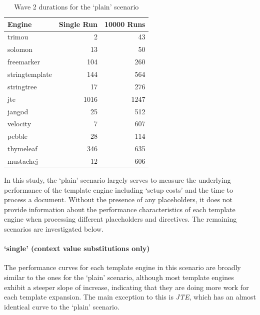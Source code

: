 \begin{table}[ht!]
\centering
\begin{tabular}{lrr}
\textbf{Engine} & \textbf{Single Run} & \textbf{10000 Runs} \\
\hline
trimou & 2 & 43 \\
solomon & 13 & 50 \\
freemarker & 104 & 260 \\
stringtemplate & 144 & 564 \\
stringtree & 17 & 276 \\
jte & 1016 & 1247 \\
jangod & 25 & 512\\
velocity & 7 & 607\\
pebble & 28 & 114 \\
thymeleaf & 346 & 635 \\
mustachej & 12 & 606 \\
\end{tabular}
\caption{Wave 2 durations for the `plain' scenario\label{w2:results:plain}}
\end{table}


In this study, the `plain' scenario largely serves to measure the underlying performance of the template engine including `setup costs' and the time to process a document. Without the presence of any placeholders, it does not provide information about the performance characteristics of each template engine when processing different placeholders and directives. The remaining scenarios are investigated below.

\paragraph{`single' (context value substitutions only)}

The performance curves for each template engine in this scenario are broadly similar to the ones for the `plain' scenario, although most template engines exhibit a steeper slope of increase, indicating that they are doing more work for each template expansion. The main exception to this is \emph{JTE}, which has an almost identical curve to the `plain' scenario.

